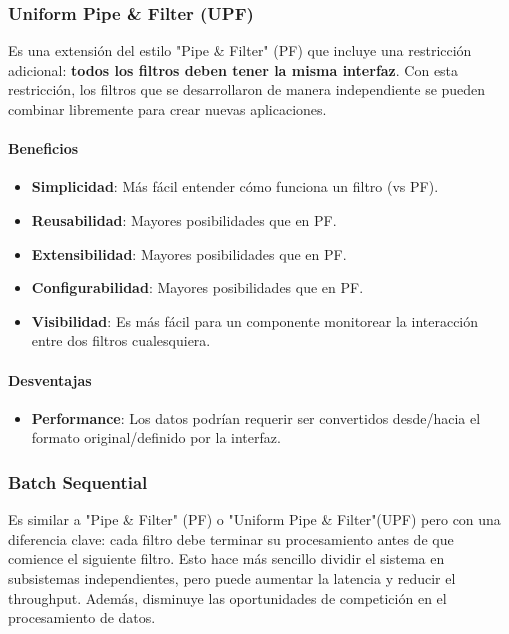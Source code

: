 \documentclass{article}
\begin{document}
			
			
			\subsubsection{Uniform Pipe \& Filter (UPF)}
			Es una extensión del estilo "Pipe \& Filter" (PF) que incluye una restricción adicional: \textbf{todos los filtros deben tener la misma interfaz}. Con esta restricción, los filtros que se desarrollaron de manera independiente se pueden combinar libremente para crear nuevas aplicaciones.
			
			\paragraph{Beneficios}
			\begin{itemize}	
				\item {\textbf{Simplicidad}}: Más fácil entender cómo funciona un filtro (vs PF).
				\item {\textbf{Reusabilidad}}: Mayores posibilidades que en PF.
				\item {\textbf{Extensibilidad}}: Mayores posibilidades que en PF.
				\item {\textbf{Configurabilidad}}: Mayores posibilidades que en PF.
				\item {\textbf{Visibilidad}}: Es más fácil para un componente monitorear la
				interacción entre dos filtros cualesquiera.
			\end{itemize}
			
			\paragraph{Desventajas}
			\begin{itemize}	
				
				\item {\textbf{Performance}}: Los datos podrían requerir ser convertidos desde/hacia el
				formato original/definido por la interfaz.
				
			\end{itemize}
			
			\subsubsection{Batch Sequential}
			
			Es similar a "Pipe \& Filter" (PF) o "Uniform Pipe \& Filter"(UPF) pero con una diferencia clave: cada filtro debe terminar su procesamiento antes de que comience el siguiente filtro. Esto hace más sencillo dividir el sistema en subsistemas independientes, pero puede aumentar la latencia y reducir el throughput. Además, disminuye las oportunidades de competición en el procesamiento de datos. 
			
\end{document}
